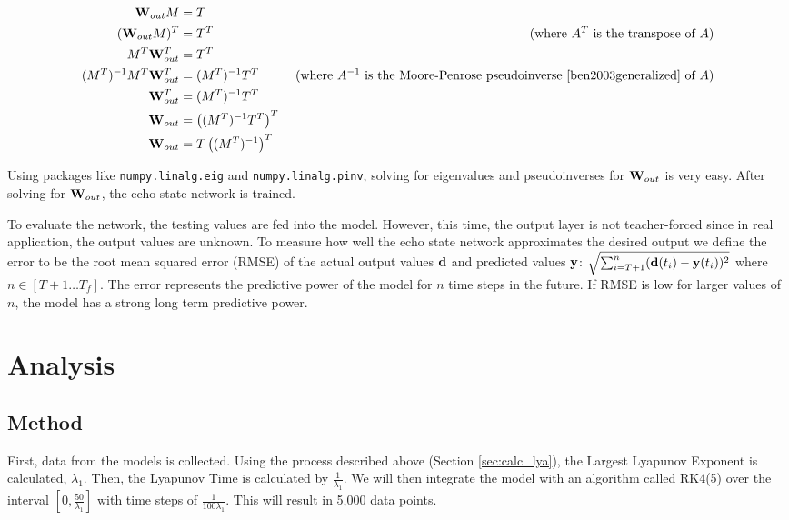 \documentclass{article}
\begin{document}
\begin{align*}
    \mathbf{W}_{out} M &= T \\
    (\mathbf{W}_{out} M)^T &= T^T & \text{ (where $A^T$ is the transpose of $A$)} \\
    M^T \mathbf{W}_{out}^T &= T^T \\
    (M^T)^{-1} M^T \mathbf{W}_{out}^T &= (M^T)^{-1} T^T & \text{ (where $A^{-1}$ is the Moore-Penrose pseudoinverse \cite{ben2003generalized} of $A$)} \\
    \mathbf{W}_{out}^T &= (M^T)^{-1} T^T \\
    \mathbf{W}_{out} &= \left((M^T)^{-1} T^T\right)^T \\
    \mathbf{W}_{out} &= T \left((M^T)^{-1}\right)^T
\end{align*}

Using packages like \texttt{numpy.linalg.eig} and \texttt{numpy.linalg.pinv},
solving for eigenvalues and pseudoinverses for $\mathbf{W}_{out}$ is very easy. After
solving for $\mathbf{W}_{out}$, the echo state network is trained.

To evaluate the network, the testing values are fed into the model. However,
this time, the output layer is not teacher-forced since in real application,
the output values are unknown. To measure how well the echo state network
approximates the desired output we define the error to be the root mean
squared error (RMSE) of the actual output values $\mathbf{d}$ and predicted values
$\mathbf{y}$: $\sqrt{\sum_{i=T+1}^{n} (\mathbf{d}(t_i) - \mathbf{y}(t_i))^2}$ where $n \in [T+1
\dots T_f]$. The error represents the predictive power of the model for $n$
time steps in the future. If RMSE is low for larger values of $n$, the model
has a strong long term predictive power.



\section{Analysis}

\subsection{Method}

First, data from the models is collected. Using the process described above
(Section \ref{sec:calc_lya}), the Largest Lyapunov Exponent is calculated,
$\lambda_1$. Then, the Lyapunov Time is calculated by $\frac{1}{\lambda_1}$.
We will then integrate the model with an algorithm called RK4(5) over the
interval $[0, \frac{50}{\lambda_1}]$ with time steps of $\frac{1}{100
\lambda_1}$. This will result in 5,000 data points.
\end{document}
